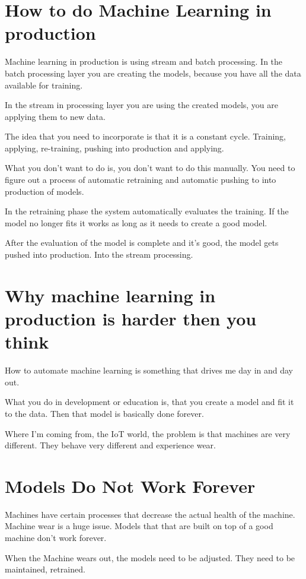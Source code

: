 \documentclass[12pt, numbers=noenddot]{scrreprt} %
\begin{document}
\section{How to do Machine Learning in production}
Machine learning in production is using stream and batch processing. In the batch processing layer you are creating the models, because you have all the data available for training.

In the stream in processing layer you are using the created models, you are applying them to new data.

The idea that you need to incorporate is that it is a constant cycle. Training, applying, re-training, pushing into production and applying.

What you don’t want to do is, you don’t want to do this manually. You need to figure out a process of automatic retraining and automatic pushing to into production of models.

In the retraining phase the system automatically evaluates the training. If the model no longer fits it works as long as it needs to create a good model.

After the evaluation of the model is complete and it’s good, the model gets pushed into production. Into the stream processing.

\section{Why machine learning in production is harder then you think}
How to automate machine learning is something that drives me day in and day out.

What you do in development or education is, that you create a model and fit it to the data. Then that model is basically done forever.

Where I’m coming from, the IoT world, the problem is that machines are very different. They behave very different and experience wear.

\section{Models Do Not Work Forever}

Machines have certain processes that decrease the actual health of the machine. Machine wear is a huge issue. Models that that are built on top of a good machine don’t work forever.

When the Machine wears out, the models need to be adjusted. They need to be maintained, retrained.
\end{document}
